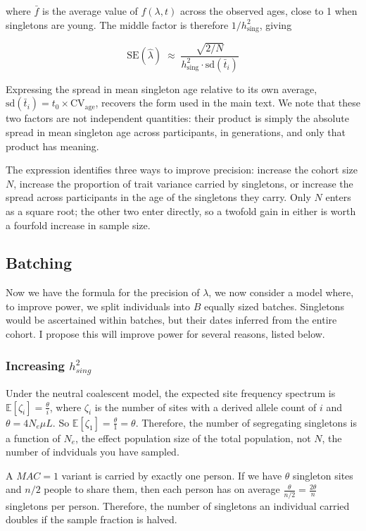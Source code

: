 \documentclass{article}
\begin{document}
where $\bar f$ is the average value of $f(\lambda, t)$ across the observed ages, close to 1 when singletons are young. The middle factor is therefore $1/h^2_{\text{sing}}$, giving

$$\boxed{\;\mathrm{SE}(\hat\lambda) \;\approx\; \frac{\sqrt{2/N}}{h^2_{\text{sing}} \cdot \mathrm{sd}(\bar t_i)}\;}$$

Expressing the spread in mean singleton age relative to its own average, $\mathrm{sd}(\bar t_i) = t_0 \times \mathrm{CV_{age}}$, recovers the form used in the main text. We note that these two factors are not independent quantities: their product is simply the absolute spread in mean singleton age across participants, in generations, and only that product has meaning.

The expression identifies three ways to improve precision: increase the cohort size $N$, increase the proportion of trait variance carried by singletons, or increase the spread across participants in the age of the singletons they carry. Only $N$ enters as a square root; the other two enter directly, so a twofold gain in either is worth a fourfold increase in sample size.


\subsection{Batching}

Now we have the formula for the precision of $\lambda$, we now consider a model where, to improve power, we split individuals into $B$ equally sized batches. Singletons would be ascertained within batches, but their dates inferred from the entire cohort. I propose this will improve power for several reasons, listed below.

\subsubsection{Increasing $h^2_{sing}$}

Under the neutral coalescent model, the expected site frequency spectrum is $\mathbb{E}[\zeta_{i}] = \frac{\theta}{i}$, where $\zeta_{i}$ is the number of sites with a derived allele count of $i$ and $\theta = 4N_{e} \mu L$. So $\mathbb{E}[\zeta_1] = \frac{\theta}{1} = \theta $. Therefore, the number of segregating singletons is a function of $N_{e}$, the effect population size of the total population, not $N$, the number of indviduals you have sampled.

A $MAC = 1$ variant is carried by exactly one person. If we have $\theta$ singleton sites and $n/2$ people to share them, then each person has on average $\frac{\theta}{n/2} = \frac{2\theta}{n}$ singletons per person. Therefore, the number of singletons an individual carried doubles if the sample fraction is halved.
\end{document}
